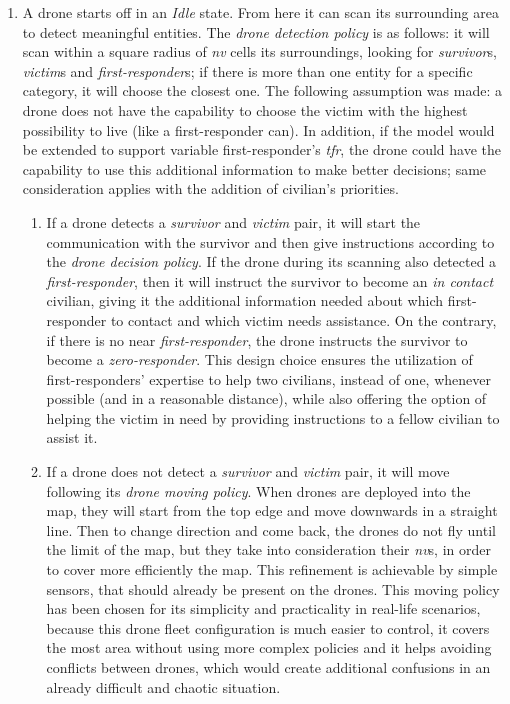 \begin{enumerate}
	\item A drone starts off in an \textit{Idle} state. From here it can scan its surrounding area to detect meaningful entities. The \textit{drone detection policy} is as follows: it will scan within a square radius of \textit{nv} cells its surroundings, looking for \textit{survivor}s, \textit{victim}s and \textit{first-responder}s; if there is more than one entity for a specific category, it will choose the closest one. The following assumption was made: a drone does not have the capability to choose the victim with the highest possibility to live (like a first-responder can). In addition, if the model would be extended to support variable first-responder's \textit{tfr}, the drone could have the capability to use this additional information to make better decisions; same consideration applies with the addition of civilian's priorities.
		\begin{enumerate}
		\item If a drone detects a \textit{survivor} and \textit{victim} pair, it will start the communication with the survivor and then give instructions according to the \textit{drone decision policy}. If the drone during its scanning also detected a \textit{first-responder}, then it will instruct the survivor to become an \textit{in contact} civilian, giving it the additional information needed about which first-responder to contact and which victim needs assistance. On the contrary, if there is no near \textit{first-responder}, the drone instructs the survivor to become a \textit{zero-responder}. This design choice ensures the utilization of first-responders' expertise to help two civilians, instead of one, whenever possible (and in a reasonable distance), while also offering the option of helping the victim in need by providing instructions to a fellow civilian to assist it.
		
		\item If a drone does not detect a \textit{survivor} and \textit{victim} pair, it will move following its \textit{drone moving policy}. When drones are deployed into the map, they will start from the top edge and move downwards in a straight line. Then to change direction and come back, the drones do not fly until the limit of the map, but they take into consideration their \textit{nv}s, in order to cover more efficiently the map. This refinement is achievable by simple sensors, that should already be present on the drones. This moving policy has been chosen for its simplicity and practicality in real-life scenarios, because this drone fleet configuration is much easier to control, it covers the most area without using more complex policies and it helps avoiding conflicts between drones, which would create additional confusions in an already difficult and chaotic situation.
	\end{enumerate}
	

\end{enumerate}
